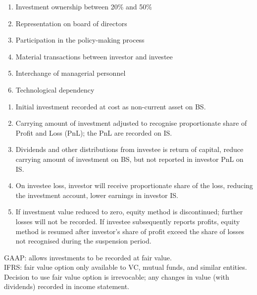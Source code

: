 \begin{remark} 
\begin{enumerate}[label=\roman*.]
\setlength{\itemsep}{0pt}
\item Investment ownership between 20\% and 50\%
\item Representation on board of directors
\item Participation in the policy-making process
\item Material transactions between investor and investee
\item Interchange of managerial personnel
\item Technological dependency
\end{enumerate}
\end{remark}

\begin{method} 
\begin{enumerate}[label=\roman*.]
\setlength{\itemsep}{0pt}
\item Initial investment recorded at cost as non-current asset on BS.
\item Carrying amount of investment adjusted to recognise proportionate share of Profit and Loss (PnL); the PnL are recorded on IS.
\item Dividends and other distributions from investee is return of capital, reduce carrying amount of investment on BS, but not reported in investor PnL on IS.
\item On investee loss, investor will receive proportionate share of the loss, reducing the investment account, lower earnings in investor IS.
\item If investment value reduced to zero, equity method is discontinued; further losses will not be recorded. If investee subsequently reports profits, equity method is resumed after investor’s share of profit exceed the share of losses not recognised during the suspension period.
\end{enumerate}
GAAP: allows investments to be recorded at fair value.\\
IFRS: fair value option only available to VC, mutual funds, and similar entities. Decision to use fair value option is irrevocable; any changes in value (with dividends) recorded in income statement.
\end{method}
